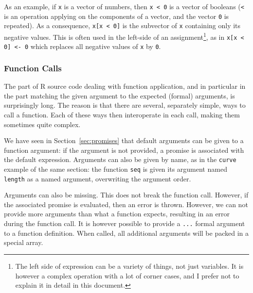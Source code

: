 \documentclass{article}
\newcommand\R{R}
\begin{document}
As an example, if \texttt{x} is a vector of numbers,
then \texttt{x < 0} is a vector of booleans
(\texttt{<} is an operation applying on the components
of a vector, and the vector \texttt{0} is repeated).
As a consequence, \texttt{x[x < 0]} is the subvector of
\texttt{x} containing only its negative values.
This is often used in the left-side of an assignment\footnote{
    The left side of expression can be a variety of things,
    not just variables.
    It is however a complex operation with a lot of corner cases,
    and I prefer not to explain it in detail in this document.
}, as in \texttt{x[x < 0] <- 0} which replaces all
negative values of \texttt{x} by \texttt{0}.

\subsubsection{Function Calls}

The part of \R{} source code dealing with function application,
and in particular in the part matching the given argument to the
expected (formal) arguments, is surprisingly long.
The reason is that there are several, separately simple, ways to call
a function.
Each of these ways then interoperate in each call,
making them sometimes quite complex.

We have seen in Section~\ref{sec:promises} that default arguments can be given
to a function argument:
if the argument is not provided, a promise is associated with the default expression.
Arguments can also be given by name,
as in the \texttt{curve} example of the same section:
the function \texttt{seq} is given its argument named \texttt{length}
as a named argument,
overwriting the argument order.

Arguments can also be missing.
This does not break the function call.
However, if the associated promise is evaluated, then an error is thrown.
However, we can not provide more arguments than what a function expects,
resulting in an error during the function call.
It is however possible to provide a \texttt{...} formal argument
to a function definition.
When called, all additional arguments will be packed in a special array.
\end{document}
